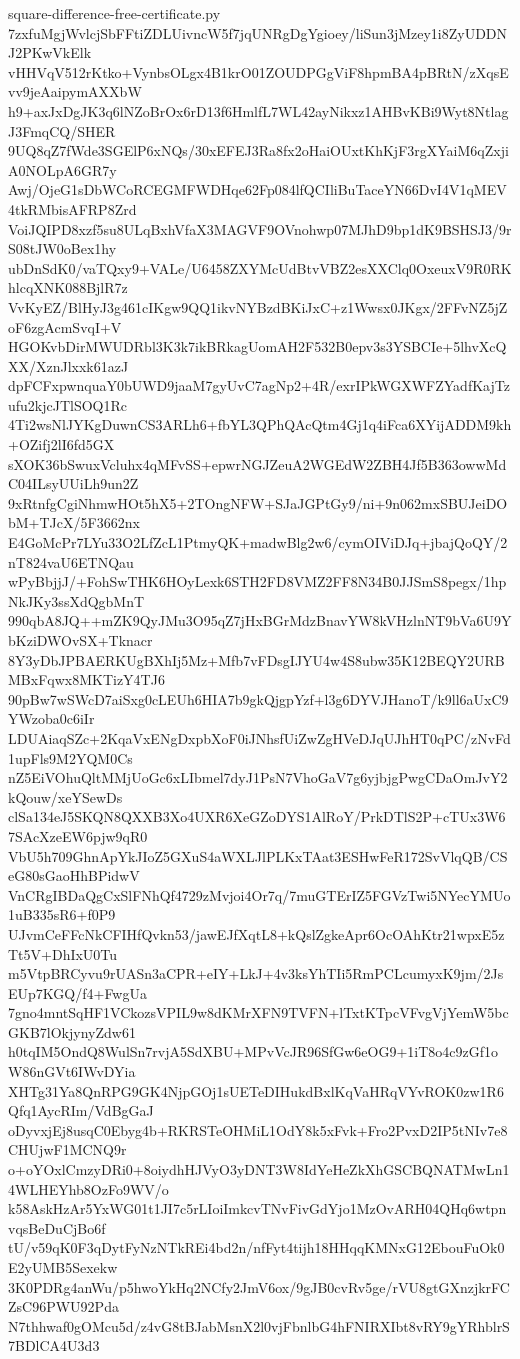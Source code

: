 \documentclass[11pt]{article}
\theoremstyle{definition}
\theoremstyle{remark}
\begin{document}
\begin{filecontents*}[overwrite]{square-difference-free-certificate.py}
7zxfuMgjWvlcjSbFFtiZDLUivncW5f7jqUNRgDgYgioey/liSun3jMzey1i8ZyUDDNJ2PKwVkElk
vHHVqV512rKtko+VynbsOLgx4B1krO01ZOUDPGgViF8hpmBA4pBRtN/zXqsEvv9jeAaipymAXXbW
h9+axJxDgJK3q6lNZoBrOx6rD13f6HmlfL7WL42ayNikxz1AHBvKBi9Wyt8NtlagJ3FmqCQ/SHER
9UQ8qZ7fWde3SGElP6xNQs/30xEFEJ3Ra8fx2oHaiOUxtKhKjF3rgXYaiM6qZxjiA0NOLpA6GR7y
Awj/OjeG1sDbWCoRCEGMFWDHqe62Fp084lfQCIliBuTaceYN66DvI4V1qMEV4tkRMbisAFRP8Zrd
VoiJQIPD8xzf5su8ULqBxhVfaX3MAGVF9OVnohwp07MJhD9bp1dK9BSHSJ3/9rS08tJW0oBex1hy
ubDnSdK0/vaTQxy9+VALe/U6458ZXYMcUdBtvVBZ2esXXClq0OxeuxV9R0RKhlcqXNK088BjlR7z
VvKyEZ/BlHyJ3g461cIKgw9QQ1ikvNYBzdBKiJxC+z1Wwsx0JKgx/2FFvNZ5jZoF6zgAcmSvqI+V
HGOKvbDirMWUDRbl3K3k7ikBRkagUomAH2F532B0epv3s3YSBCIe+5lhvXcQXX/XznJlxxk61azJ
dpFCFxpwnquaY0bUWD9jaaM7gyUvC7agNp2+4R/exrIPkWGXWFZYadfKajTzufu2kjcJTlSOQ1Rc
4Ti2wsNlJYKgDuwnCS3ARLh6+fbYL3QPhQAcQtm4Gj1q4iFca6XYijADDM9kh+OZifj2lI6fd5GX
sXOK36bSwuxVcluhx4qMFvSS+epwrNGJZeuA2WGEdW2ZBH4Jf5B363owwMdC04ILsyUUiLh9un2Z
9xRtnfgCgiNhmwHOt5hX5+2TOngNFW+SJaJGPtGy9/ni+9n062mxSBUJeiDObM+TJcX/5F3662nx
E4GoMcPr7LYu33O2LfZcL1PtmyQK+madwBlg2w6/cymOIViDJq+jbajQoQY/2nT824vaU6ETNQau
wPyBbjjJ/+FohSwTHK6HOyLexk6STH2FD8VMZ2FF8N34B0JJSmS8pegx/1hpNkJKy3ssXdQgbMnT
990qbA8JQ++mZK9QyJMu3O95qZ7jHxBGrMdzBnavYW8kVHzlnNT9bVa6U9YbKziDWOvSX+Tknacr
8Y3yDbJPBAERKUgBXhIj5Mz+Mfb7vFDsgIJYU4w4S8ubw35K12BEQY2URBMBxFqwx8MKTizY4TJ6
90pBw7wSWcD7aiSxg0cLEUh6HIA7b9gkQjgpYzf+l3g6DYVJHanoT/k9ll6aUxC9YWzoba0c6iIr
LDUAiaqSZc+2KqaVxENgDxpbXoF0iJNhsfUiZwZgHVeDJqUJhHT0qPC/zNvFd1upFls9M2YQM0Cs
nZ5EiVOhuQltMMjUoGc6xLIbmel7dyJ1PsN7VhoGaV7g6yjbjgPwgCDaOmJvY2kQouw/xeYSewDs
clSa134eJ5SKQN8QXXB3Xo4UXR6XeGZoDYS1AlRoY/PrkDTlS2P+cTUx3W67SAcXzeEW6pjw9qR0
VbU5h709GhnApYkJIoZ5GXuS4aWXLJlPLKxTAat3ESHwFeR172SvVlqQB/CSeG80sGaoHhBPidwV
VnCRgIBDaQgCxSlFNhQf4729zMvjoi4Or7q/7muGTErIZ5FGVzTwi5NYecYMUo1uB335sR6+f0P9
UJvmCeFFcNkCFIHfQvkn53/jawEJfXqtL8+kQslZgkeApr6OcOAhKtr21wpxE5zTt5V+DhIxU0Tu
m5VtpBRCyvu9rUASn3aCPR+eIY+LkJ+4v3ksYhTIi5RmPCLcumyxK9jm/2JsEUp7KGQ/f4+FwgUa
7gno4mntSqHF1VCkozsVPIL9w8dKMrXFN9TVFN+lTxtKTpcVFvgVjYemW5bcGKB7lOkjynyZdw61
h0tqIM5OndQ8WulSn7rvjA5SdXBU+MPvVcJR96SfGw6eOG9+1iT8o4c9zGf1oW86nGVt6IWvDYia
XHTg31Ya8QnRPG9GK4NjpGOj1sUETeDIHukdBxlKqVaHRqVYvROK0zw1R6Qfq1AycRIm/VdBgGaJ
oDyvxjEj8usqC0Ebyg4b+RKRSTeOHMiL1OdY8k5xFvk+Fro2PvxD2IP5tNIv7e8CHUjwF1MCNQ9r
o+oYOxlCmzyDRi0+8oiydhHJVyO3yDNT3W8IdYeHeZkXhGSCBQNATMwLn14WLHEYhb8OzFo9WV/o
k58AskHzAr5YxWG01t1JI7c5rLIoiImkcvTNvFivGdYjo1MzOvARH04QHq6wtpnvqsBeDuCjBo6f
tU/v59qK0F3qDytFyNzNTkREi4bd2n/nfFyt4tijh18HHqqKMNxG12EbouFuOk0E2yUMB5Sexekw
3K0PDRg4anWu/p5hwoYkHq2NCfy2JmV6ox/9gJB0cvRv5ge/rVU8gtGXnzjkrFCZsC96PWU92Pda
N7thhwaf0gOMcu5d/z4vG8tBJabMsnX2l0vjFbnlbG4hFNIRXIbt8vRY9gYRhblrS7BDlCA4U3d3

\end{filecontents*}
\end{document}
